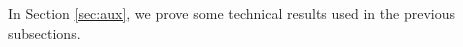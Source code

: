 \documentclass [11pt,oneside,a4paper,mathscr]{amsart}
\newtheorem{thm}{Theorem}[section]
\theoremstyle{definition}
\newcommand{\X}{\mathscr{X}}
\begin{document}
In Section \ref{sec:aux}, we prove some technical results used in the previous subsections. 







\end{document}
